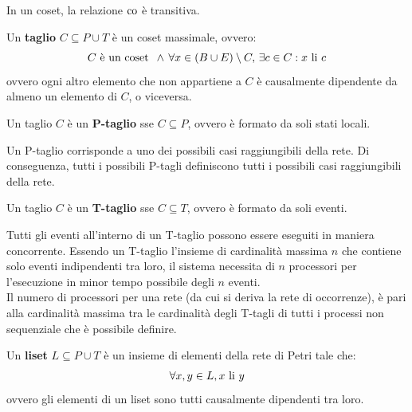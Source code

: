 \begin{rem}
    In un coset, la relazione $\textnormal{co}$ è transitiva.
\end{rem}

\begin{defn}
    Un \textbf{taglio} $C \subseteq P \cup T$ è un coset massimale, ovvero:
    \[
        C \textnormal{ è un coset } \, \land \, \forall x \in (B \cup E) \setminus C, \,
        \exists c \in C : x \textnormal{ li } c
    \]
    ovvero ogni altro elemento che non appartiene a $C$ è causalmente
    dipendente da almeno un elemento di $C$, o viceversa.
\end{defn}

\begin{defn}
    Un taglio $C$ è un \textbf{P-taglio} sse $C \subseteq P$, ovvero è formato
    da soli stati locali.
\end{defn}

\begin{rem}
    Un P-taglio corrisponde a uno dei possibili casi raggiungibili della rete.
    Di conseguenza, tutti i possibili P-tagli definiscono tutti i possibili
    casi raggiungibili della rete.
\end{rem}

\begin{defn}
    Un taglio $C$ è un \textbf{T-taglio} sse $C \subseteq T$, ovvero è formato
    da soli eventi.
\end{defn}

\begin{rem}
    Tutti gli eventi all'interno di un T-taglio possono essere eseguiti in
    maniera concorrente. Essendo un T-taglio l'insieme di cardinalità massima
    $n$ che contiene solo eventi indipendenti tra loro, il sistema necessita
    di $n$ processori per l'esecuzione in minor tempo possibile degli $n$
    eventi.\\
    Il numero di processori per una rete (da cui si deriva la rete di
    occorrenze), è pari alla cardinalità massima tra le cardinalità degli
    T-tagli di tutti i processi non sequenziale che è possibile definire.
\end{rem}

\begin{defn}
    Un \textbf{liset} $L \subseteq P \cup T$ è un insieme di elementi della
    rete di Petri tale che:
    \[
        \forall x, y \in L, x \textnormal{ li } y
    \]
    ovvero gli elementi di un liset sono tutti causalmente dipendenti tra loro.
\end{defn}

